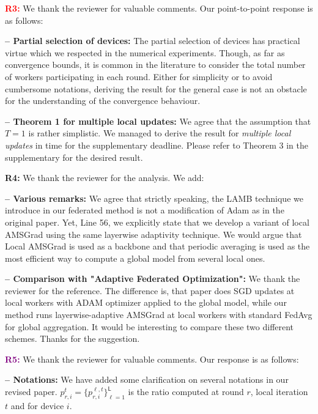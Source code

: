 \documentclass{article}
\begin{document}
\textbf{\textcolor{red}{R3:}} We thank the reviewer for valuable comments.  Our point-to-point response is as follows: \vspace{-4pt}


\textbf{-- Partial selection of devices:} The partial selection of devices has practical virtue which we respected in the numerical experiments.
Though, as far as convergence bounds, it is common in the literature to consider the total number of workers participating in each round.
Either for simplicity or to avoid cumbersome notations, deriving the result for the general case is not an obstacle for the understanding of the convergence behaviour.

\vspace{-2pt}
\textbf{-- Theorem 1 for multiple local updates:} 
We agree that the assumption that $T =1$ is rather simplistic.
We managed to derive the result for \emph{multiple local updates} in time for the supplementary deadline.
Please refer to Theorem 3 in the supplementary for the desired result.
 

\textbf{\textcolor{green!50!black}{R4:}} We thank the reviewer for the analysis. We add: \vspace{-4pt}

\textbf{-- Various remarks:}
We agree that strictly speaking, the LAMB technique we introduce in our federated method is not a modification of Adam as in the original paper.
Yet, Line 56, we explicitly state that we develop a variant of local AMSGrad using the same layerwise adaptivity technique.
We would argue that Local AMSGrad is used as a backbone and that periodic averaging is used as the most efficient way to compute a global model from several local ones.

\vspace{-2pt}
\textbf{-- Comparison with "Adaptive Federated Optimization":} 
We thank the reviewer for the reference.
The difference is, that paper does SGD updates at local workers with ADAM optimizer applied to the global model, while our method runs layerwise-adaptive AMSGrad at local workers with standard FedAvg for global aggregation.
It would be interesting to compare these two different schemes. Thanks for the suggestion.


\textbf{\textcolor{purple}{R5:}} We thank the reviewer for valuable comments. Our response is as follows: \vspace{-4pt}


\textbf{-- Notations:} We have added some clarification on several notations in our revised paper. 
$p_{r,i}^{t} = \{p_{r,i}^{\ell,t}\}_{\ell=1}^{\mathsf{L}}$ is the ratio computed at round $r$, local iteration $t$ and for device $i$.
\end{document}
